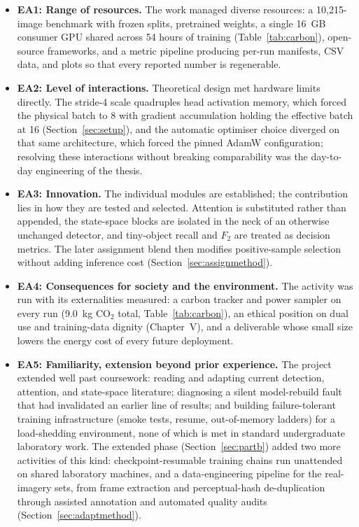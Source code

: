 \begin{itemize}
  \item \textbf{EA1: Range of resources.} The work managed diverse
        resources: a 10{,}215-image benchmark with frozen splits, pretrained
        weights, a single 16~GB consumer GPU shared across 54 hours of
        training (Table~\ref{tab:carbon}), open-source frameworks, and a
        metric pipeline producing per-run manifests, CSV data, and plots so
        that every reported number is regenerable.
  \item \textbf{EA2: Level of interactions.} Theoretical design met hardware
        limits directly. The stride-4 scale quadruples head activation
        memory, which forced the physical batch to 8 with gradient
        accumulation holding the effective batch at 16 (Section~\ref{sec:setup}), and
        the automatic optimiser choice diverged on that same architecture,
        which forced the pinned AdamW configuration; resolving these
        interactions without breaking comparability was the day-to-day
        engineering of the thesis.
  \item \textbf{EA3: Innovation.} The individual modules are established; the
        contribution lies in how they are tested and selected. Attention is
        substituted rather than appended, the state-space blocks are isolated
        in the neck of an otherwise unchanged detector, and tiny-object recall
        and $F_2$ are treated as decision metrics. The later assignment blend
        then modifies positive-sample selection without adding inference cost
        (Section~\ref{sec:assignmethod}).
  \item \textbf{EA4: Consequences for society and the environment.} The
        activity was run with its externalities measured: a carbon tracker
        and power sampler on every run (9.0~kg CO$_2$ total,
        Table~\ref{tab:carbon}), an ethical position on dual use and
        training-data dignity (Chapter~V), and a deliverable whose small
        size lowers the energy cost of every future deployment.
  \item \textbf{EA5: Familiarity, extension beyond prior experience.} The
        project extended well past coursework: reading and adapting current
        detection, attention, and state-space literature; diagnosing a
        silent model-rebuild fault that had invalidated an earlier line of
        results; and building failure-tolerant training infrastructure
        (smoke tests, resume, out-of-memory ladders) for a load-shedding
        environment, none of which is met in standard undergraduate
        laboratory work. The extended phase (Section~\ref{sec:partb}) added
        two more activities of this kind: checkpoint-resumable training
        chains run unattended on shared laboratory machines, and a
        data-engineering pipeline for the real-imagery sets, from frame
        extraction and perceptual-hash de-duplication through assisted
        annotation and automated quality audits
        (Section~\ref{sec:adaptmethod}).
\end{itemize}

